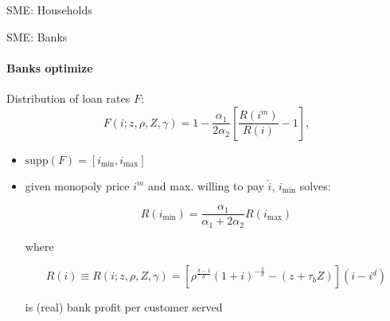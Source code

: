 \documentclass[10pt,english,slidetop,compress,
              blue,mathserif,color=option]{beamer}
\theoremstyle{plain}
\theoremstyle{definition}
\begin{document}
\begin{frame}[allowframebreaks]{SME: Households}




\end{frame}

\begin{frame}{SME: Banks}
\framesubtitle{Banks optimize}


  Distribution of loan rates $F$:
    \begin{equation}
        F\left(i;z,\rho,Z,\gamma\right)
        = 1 - \frac{\alpha_1}{2\alpha_2}\left[\frac{R\left(i^{m}\right)}{R\left(i\right)}-1\right],
    \end{equation}

  \begin{itemize}
    \item $\text{supp}\left(F\right)=\left[i_{\min},i_{\max}\right]$

    \item given monopoly price $i^{m}$ and max. willing to pay $\hat{i}$, $i_{\min}$ solves:

      \begin{equation}
          R\left(i_{\min}\right)
          =
          \frac{\alpha_{1}}{\alpha_{1}+2\alpha_{2}}R\left(i_{\max}\right)
      \end{equation}

    where

      \begin{equation}
          R\left(i\right)
          \equiv R\left(i;z,\rho,Z,\gamma\right)
          = \left[\rho^{\frac{\sigma-1}{\sigma}}\left(1+i\right)^{-\frac{1}{\sigma}}
          -\left(z+\tau_{b}Z\right)\right]\left( i-i^{d} \right)
      \end{equation}

      is (real) bank profit per customer served
  \end{itemize}
\end{frame}
\end{document}
